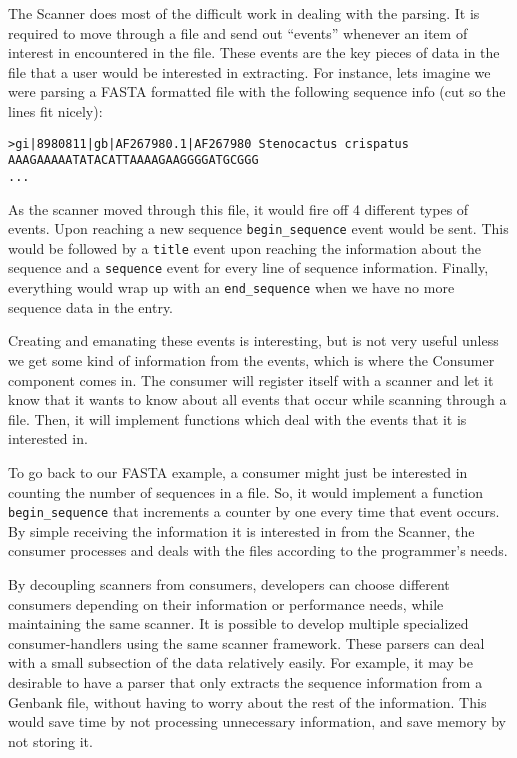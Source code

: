 \documentclass[dvips]{article}
\begin{document}
The Scanner does most of the difficult work in dealing with the parsing. It is required to move through a file and send out ``events'' whenever an item of interest in encountered in the file. These events are the key pieces of data in the file that a user would be interested in extracting. For instance, lets imagine we were parsing a FASTA formatted file with the following sequence info (cut so the lines fit nicely):

\begin{verbatim}
>gi|8980811|gb|AF267980.1|AF267980 Stenocactus crispatus
AAAGAAAAATATACATTAAAAGAAGGGGATGCGGG
...
\end{verbatim}


As the scanner moved through this file, it would fire off 4 different types of events. Upon reaching a new sequence \verb|begin_sequence| event would be sent. This would be followed by a \verb|title| event upon reaching the information about the sequence and a \verb|sequence| event for every line of sequence information. Finally, everything would wrap up with an \verb|end_sequence| when we have no more sequence data in the entry. 


Creating and emanating these events is interesting, but is not very useful unless we get some kind of information from the events, which is where the Consumer component comes in. The consumer will register itself with a scanner and let it know that it wants to know about all events that occur while scanning through a file. Then, it will implement functions which deal with the events that it is interested in. 


To go back to our FASTA example, a consumer might just be interested in counting the number of sequences in a file. So, it would implement a function \verb|begin_sequence| that increments a counter by one every time that event occurs.  By simple receiving the information it is interested in from the Scanner, the consumer processes and deals with the files according to the programmer's needs.


By decoupling scanners from consumers, developers can choose different consumers depending on their information or performance needs, while maintaining the same scanner. It is possible to develop multiple specialized consumer-handlers using the same scanner framework.  These parsers can deal with a small subsection of the data relatively easily. For example, it may be desirable to have a parser that only extracts the sequence information from a Genbank file, without having to worry about the rest of the information. This would save time by not processing unnecessary information, and save memory by not storing it.
\end{document}
